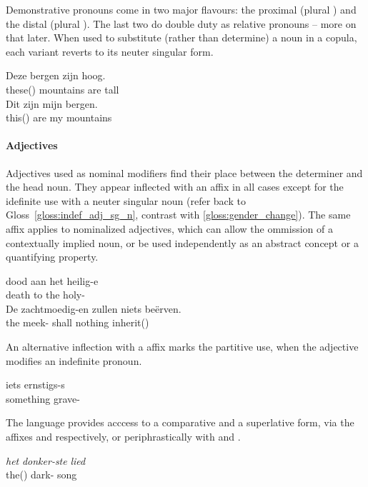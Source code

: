 Demonstrative pronouns come in two major flavours: the proximal  (plural ) and the distal  (plural ).
The last two do double duty as relative pronouns -- more on that later.
When used to substitute (rather than determine) a noun in a copula, each variant reverts to its neuter singular form.
\begin{exe}
\ex
\begin{xlist}
\ex
\gll Deze bergen zijn hoog.\\
these() mountains are tall\\
\ex
\gll Dit zijn mijn bergen.\\
this() are my mountains\\
\end{xlist}
\end{exe}

\paragraph{Adjectives}
Adjectives used as nominal modifiers find their place between the determiner and the head noun.
They appear inflected with an  affix in all cases except for the idefinite use with a neuter singular noun (refer back to Gloss~\ref{gloss:indef_adj_sg_n}, contrast with \ref{gloss:gender_change}).
The same affix applies to nominalized adjectives, which can allow the ommission of a contextually implied noun, or be used independently as an abstract concept or a quantifying property.
\begin{exe}
\ex
\gll dood aan het heilig-e\\
death to the holy-\\
\ex
\gll De zachtmoedig-en zullen niets be\"{e}rven.\\
the meek- shall nothing inherit()\\
\end{exe}
An alternative inflection with a  affix marks the partitive use, when the adjective modifies an indefinite pronoun.
\begin{exe}
\ex
\gll iets ernstigs-s\\
something grave-\\
\end{exe}
The language provides acccess to a comparative and a superlative form, via the affixes  and  respectively, or periphrastically with  and .
\begin{exe}
\ex
\gll \textit{het} \textit{donker-ste} \textit{lied}\\
the() dark- song\\
\end{exe}

